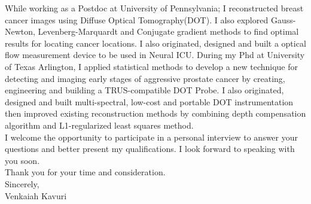 \documentclass{my_cv}
\begin{document}
While working as a Postdoc at University of Pennsylvania; I reconstructed breast cancer images using Diffuse Optical Tomography(DOT). I also explored Gauss-Newton, Levenberg-Marquardt and Conjugate gradient methods to find optimal results for locating cancer locations. I also originated, designed and built a optical flow measurement device to be used in Neural ICU.  During my Phd at University of Texas Arlington, I applied statistical methods to develop a new technique for detecting and imaging early stages of aggressive prostate cancer by creating, engineering and building a TRUS-compatible DOT Probe. I also originated, designed and built multi-spectral, low-cost and portable DOT instrumentation then improved existing reconstruction methods by combining depth compensation algorithm and L1-regularized least squares method.\\

\vspace{2mm} 
I welcome the opportunity to participate in a personal interview to answer your questions and better present my qualifications. I look forward to speaking with you soon.\\
\vspace{2mm} 
Thank you for your time and consideration.\\
\vspace{10mm} 
Sincerely,\\

\vspace{5mm} 
Venkaiah Kavuri\\
\end{document}

